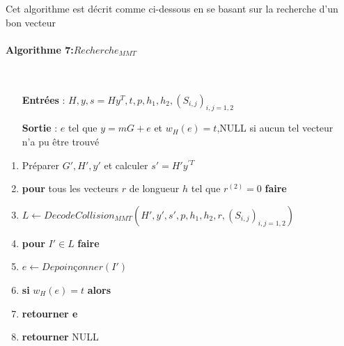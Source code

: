 \documentclass[12pt,openany]{report}
\begin{document}
Cet algorithme est décrit comme ci-dessous en se basant sur la recherche d'un bon vecteur

\begin{flushleft}
\begin{boxedminipage}[ poslb ]{15cm}

\paragraph{Algorithme 7:$Recherche_{MMT}$ }\cite{Ghazal}\\
\begin{itemize}
\item[\textbf{Entrées}]: $\mathit{H},y,s=\mathit{H}y^T,t,p,h_1,h_2,(S_{i,j})_{i,j=1,2}  $
\item[\textbf{Sortie}] : $e$ tel que $ y=mG+e  $ et $  w_{H}(e)=t $,NULL si aucun tel vecteur \\ n'a pu être trouvé
\end{itemize}
\begin{enumerate}
\item Préparer $ G',H',y' $ et calculer $ s'=H'y^{'T} $
\item \textbf{pour} tous les vecteurs $r$ de longueur $h$ tel que $ r^{(2)}=0  $ \textbf{faire}
\item \hspace{0.3cm} $ L \gets DecodeCollision_{MMT}(H',y',s',p,h_1,h_2,r,(S_{i,j})_{i,j=1,2})  $
\item \hspace{0.5cm} \textbf{pour} $ I' \in L $ \textbf{faire}
\item \hspace{0.8cm} $ e \gets Depoinçonner(I')
 $
 \item \hspace{0.8cm} \textbf{si} \hspace{0.2cm} $w_{H}(e)=t  $ \hspace{0.2cm} \textbf{alors}
 \item \hspace{0.8cm} \textbf{retourner e}
 \item \textbf{retourner} NULL
 
\end{enumerate}
\end{boxedminipage}
\end{flushleft}
\end{document}
